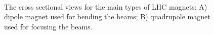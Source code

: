 \begin{figure}[htbp]
  \centering
  \mbox{
     \qquad
     \qquad
  }
  \caption[LHC Dipole and Quadrupole Magnets]{The cross sectional views for the main types of LHC magnets: A) dipole magnet used for bending the beams; B) quadrupole magnet used for focusing the beams.\cite{dipole,quadrupole}}
  \label{fig:lhcmagnets}
\end{figure}

